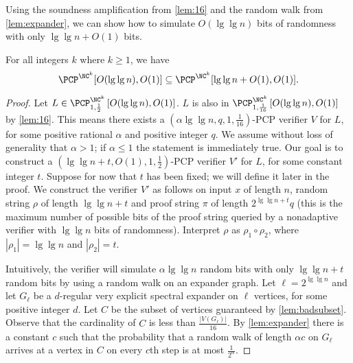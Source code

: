 \documentclass{article}
\newcommand{\PCPcs}[5]{\PCP^{#1}_{#2, #3}\left[#4, #5\right]}
\begin{document}
Using the soundness amplification from \autoref{lem:16} and the random walk from \autoref{lem:expander}, we can show how to simulate $O(\lg \lg n)$ bits of randomness with only $\lg \lg n + O(1)$ bits.

\begin{lemma}[{\cite[Lemma~4]{fs96}}]\label{lem:derandomize}
  For all integers $k$ where $k \geq 1$, we have
  \begin{equation*}
    \PCP^{\NC^k}[O(\lg \lg n), O(1)]
    \subseteq
    \PCP^{\NC^k}[\lg \lg n + O(1), O(1)].
  \end{equation*}
\end{lemma}
\begin{proof}
  Let $L \in \PCPcs{\NC^k}{1}{\frac{1}{2}}{O(\lg \lg n)}{O(1)}$.
  $L$ is also in $\PCPcs{\NC^k}{1}{\frac{1}{16}}{O(\lg \lg n)}{O(1)}$ by \autoref{lem:16}.
  This means there exists a $(\alpha \lg \lg n, q, 1, \frac{1}{16})$-PCP verifier $V$ for $L$, for some positive rational $\alpha$ and positive integer $q$.
  We assume without loss of generality that $\alpha > 1$; if $\alpha \leq 1$ the statement is immediately true.
  Our goal is to construct a $(\lg \lg n + t, O(1), 1, \frac{1}{2})$-PCP verifier $V'$ for $L$, for some constant integer $t$.
  Suppose for now that $t$ has been fixed; we will define it later in the proof.
  We construct the verifier $V'$ as follows on input $x$ of length $n$, random string $\rho$ of length $\lg \lg n + t$ and proof string $\pi$ of length $2^{\lg \lg n + t} q$ (this is the maximum number of possible bits of the proof string queried by a nonadaptive verifier with $\lg \lg n$ bits of randomness).
  Interpret $\rho$ as $\rho_1 \circ \rho_2$, where $|\rho_1| = \lg \lg n$ and $|\rho_2| = t$.

  Intuitively, the verifier will simulate $\alpha \lg \lg n$ random bits with only $\lg \lg n + t$ random bits by using a random walk on an expander graph.
  Let $\ell = 2^{\lg \lg n}$ and let $G_\ell$ be a $d$-regular very explicit spectral expander on $\ell$ vertices, for some positive integer $d$.
  Let $C$ be the subset of vertices guaranteed by \autoref{lem:badsubset}.
  Observe that the cardinality of $C$ is less than $\frac{|V(G_\ell)|}{16}$.
  By \autoref{lem:expander} there is a constant $c$ such that the probability that a random walk of length $\alpha c$ on $G_\ell$ arrives at a vertex in $C$ on every $c$th step is at most $\frac{1}{2^\alpha}$.


\end{proof}
\end{document}

